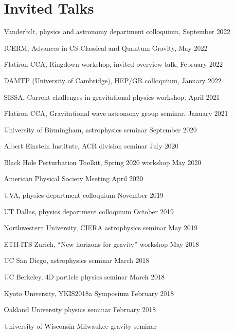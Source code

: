 \newcommand{\playsymbol}{$\blacktriangleright$}
\section{\sc Invited Talks}
\begin{etaremune}
\item
  Vanderbilt, physics and astronomy department colloquium,
  \hfill{}
  September 2022
\item
  ICERM, Advances in CS Classical and Quantum Gravity,
  \hfill{}
  May 2022
\item
  Flatiron CCA, Ringdown workshop, invited overview talk,
  \hfill{}
  February 2022
\item
  DAMTP (University of Cambridge), HEP/GR colloquium,
  \hfill{}
  January 2022
\item
  SISSA, Current challenges in gravitational physics workshop,
  \hfill{}
  April 2021
\item
  Flatiron CCA, Gravitational wave astronomy group seminar,
  \hfill{}
  January 2021
\item
  University of Birmingham, astrophysics seminar
  \hfill{}
  September 2020
\item
  Albert Einstein Institute, ACR division seminar
  \hfill{}
  July 2020
\item
  Black Hole Perturbation Toolkit, Spring 2020 workshop
  \hfill{}
  May 2020
\item
  American Physical Society Meeting
  \hfill{}
  April 2020
\item
  UVA, physics department colloquium
  \hfill{}
  November 2019
\item
  UT Dallas, physics department colloquium
  \hfill{}
  October 2019
\item
  Northwestern University, CIERA astrophysics seminar
  \hfill{}
  May 2019
\item
  ETH-ITS Zurich, ``New horizons for gravity'' workshop
  \hfill{}
  May 2018
\item
  UC San Diego, astrophysics seminar
  \hfill{}
  March 2018
\item
  UC Berkeley, 4D particle physics seminar
  \hfill{}
  March 2018
\item
  Kyoto University, YKIS2018a Symposium
  \hfill{}
  February 2018
\item
  Oakland University physics seminar
  \hfill{}
  February 2018
\item
  University of Wisconsin-Milwaukee gravity seminar

\end{etaremune}
